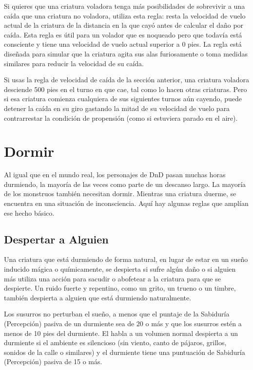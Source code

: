 \documentclass[a4paper,twocolumn,openany,10pt]{dndbook}
\begin{document}
Si quieres que una criatura voladora tenga más posibilidades de sobrevivir a una caída que una criatura no voladora, utiliza esta
regla: resta la velocidad de vuelo actual de la criatura de la distancia en la que cayó antes de calcular el daño por caída. Esta
regla es útil para un volador que es noqueado pero que todavía está consciente y tiene una velocidad de vuelo actual superior a 0
pies. La regla está diseñada para simular que la criatura agita sus alas furiosamente o toma medidas similares para reducir la
velocidad de su caída.

Si usas la regla de velocidad de caída de la sección anterior, una criatura voladora desciende 500 pies en el turno en que cae,
tal como lo hacen otras criaturas. Pero si esa criatura comienza cualquiera de sus siguientes turnos aún cayendo, puede
detener la caída en su giro gastando la mitad de su velocidad de vuelo para contrarrestar la condición de propensión (como si
estuviera parado en el aire).

\section{Dormir}
Al igual que en el mundo real, los personajes de DnD pasan muchas horas durmiendo, la mayoría de las veces como parte de un
descanso largo. La mayoría de los monstruos también necesitan dormir. Mientras una criatura duerme, se encuentra en una situación
de inconsciencia. Aquí hay algunas reglas que amplían ese hecho básico.

\subsection{Despertar a Alguien}
Una criatura que está durmiendo de forma natural, en lugar de estar en un sueño inducido mágica o químicamente, se despierta si
sufre algún daño o si alguien más utiliza una acción para sacudir o abofetear a la criatura para que se despierte. Un ruido fuerte
y repentino, como un grito, un trueno o un timbre, también despierta a alguien que está durmiendo naturalmente.

Los susurros no perturban el sueño, a menos que el puntaje de la Sabiduría (Percepción) pasiva de un durmiente sea de 20 o más y
que los susurros estén a menos de 10 pies del durmiente. El habla a un volumen normal despierta a un durmiente si el ambiente es
silencioso (sin viento, canto de pájaros, grillos, sonidos de la calle o similares) y el durmiente tiene una puntuación de
Sabiduría (Percepción) pasiva de 15 o más. 
\end{document}
